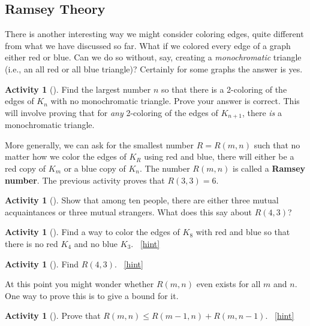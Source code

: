 \documentclass[10pt,]{book}
\newcommand{\terminology}[1]{\textbf{#1}}
\theoremstyle{plain}
\theoremstyle{definition}
\theoremstyle{definition}
\theoremstyle{definition}
\newtheorem{activity}[project]{Activity}
\numberwithin{equation}{chapter}
\begin{document}
\subsection[{Ramsey Theory}]{Ramsey Theory}\label{subsec-}
\hypertarget{p-411}{}%
There is another interesting way we might consider coloring edges, quite different from what we have discussed so far. What if we colored every edge of a graph either red or blue. Can we do so without, say, creating a \emph{monochromatic} triangle (i.e., an all red or all blue triangle)? Certainly for some graphs the answer is yes.%
\begin{activity}[]\label{act_R-3-3}
\hypertarget{p-412}{}%
Find the largest number \(n\) so that there is a 2-coloring of the edges of \(K_n\) with no monochromatic triangle.  Prove your answer is correct.  This will involve proving that for \emph{any} 2-coloring of the edges of \(K_{n+1}\), there \emph{is} a monochromatic triangle.%
\end{activity}
\hypertarget{p-413}{}%
More generally, we can ask for the smallest number \(R = R(m,n)\) such that no matter how we color the edges of \(K_R\) using red and blue, there will either be a red copy of \(K_m\) or a blue copy of \(K_n\).  The number \(R(m,n)\) is called a \terminology{Ramsey number}.  The previous activity proves that \(R(3,3) = 6\).%
\begin{activity}[]\label{activity-42}
\hypertarget{p-414}{}%
Show that among ten people, there are either three mutual acquaintances or three mutual strangers.  What does this say about \(R(4,3)\)?%
\end{activity}
\begin{activity}[]\label{activity-43}
\hypertarget{p-416}{}%
Find a way to color the edges of \(K_8\) with red and blue so that there is no red \(K_4\) and no blue \(K_3\).%
~\hfill{\tiny\hyperlink{a-50}{[hint]}\hypertarget{q-50}{}}\end{activity}
\begin{activity}[]\label{activity-44}
\hypertarget{p-418}{}%
Find \(R(4,3)\).%
~\hfill{\tiny\hyperlink{a-51}{[hint]}\hypertarget{q-51}{}}\end{activity}
\hypertarget{p-421}{}%
At this point you might wonder whether \(R(m,n)\) even exists for all \(m\) and \(n\).  One way to prove this is to give a bound for it.%
\begin{activity}[]\label{Ramseyrecurrence}
\hypertarget{p-422}{}%
Prove that \(R(m,n)\le R(m-1,n) + R(m,n-1)\).%
~\hfill{\tiny\hyperlink{a-52}{[hint]}\hypertarget{q-52}{}}\end{activity}
\end{document}
